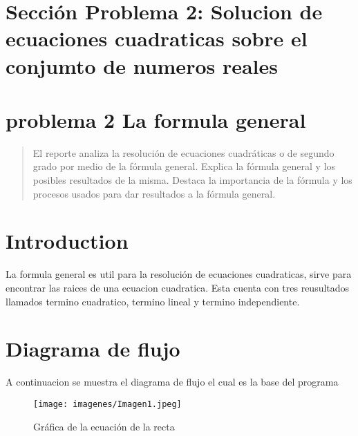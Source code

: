 \documentclass{IEEEcsmag}
\begin{document}
\section{Sección Problema 2: Solucion de ecuaciones cuadraticas sobre el conjumto de numeros reales }
\author{

}
\maketitle

\section{problema 2 La formula general}


\maketitle

\begin{abstract}

El reporte analiza la resolución de ecuaciones cuadráticas o de segundo grado por medio de la fórmula general. Explica la fórmula general y los posibles resultados de la misma. Destaca la importancia de la fórmula y los procesos usados para dar resultados a la fórmula general.
\end{abstract}

\section{Introduction}
 La formula general es util para la resolución de ecuaciones cuadraticas, sirve para encontrar las raices de una ecuacion cuadratica. Esta cuenta con tres reusultados llamados termino cuadratico, termino lineal y termino independiente.


\section{Diagrama de flujo}
A continuacion se muestra el diagrama de flujo el cual es la base del programa

\begin{figure}[h!]
    \centering
    \texttt{[image: imagenes/Imagen1.jpeg]}
    \caption{Gráfica de la ecuación de la recta}
    \label{fig:GraficaEcuacionRecta}
\end{figure}
\end{document}
